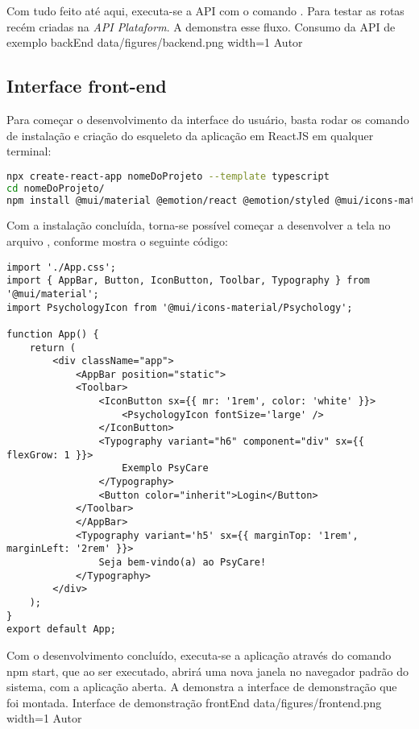 Com tudo feito até aqui, executa-se a API com o comando . Para testar as rotas recém criadas na \textit{API Plataform}. A  demonstra esse fluxo.
\image
    {Consumo da API de exemplo}
    {backEnd}
    {data/figures/backend.png}
    {width=1\textwidth}
    {Autor}

\subsection{Interface front-end}
\label{sec:frontEnd}
Para começar o desenvolvimento da interface do usuário, basta rodar os comando de instalação e criação do esqueleto da aplicação em ReactJS em qualquer terminal:
\begin{lstlisting}[language=bash]
npx create-react-app nomeDoProjeto --template typescript
cd nomeDoProjeto/
npm install @mui/material @emotion/react @emotion/styled @mui/icons-material    
\end{lstlisting}

Com a instalação concluída, torna-se possível começar a desenvolver a tela no arquivo , conforme mostra o seguinte código:
\begin{lstlisting}
import './App.css';
import { AppBar, Button, IconButton, Toolbar, Typography } from '@mui/material';
import PsychologyIcon from '@mui/icons-material/Psychology';

function App() {
    return (
        <div className="app">
            <AppBar position="static">
            <Toolbar>
                <IconButton sx={{ mr: '1rem', color: 'white' }}>
                    <PsychologyIcon fontSize='large' />
                </IconButton>
                <Typography variant="h6" component="div" sx={{ flexGrow: 1 }}>
                    Exemplo PsyCare
                </Typography>
                <Button color="inherit">Login</Button>
            </Toolbar>
            </AppBar>
            <Typography variant='h5' sx={{ marginTop: '1rem', marginLeft: '2rem' }}>
                Seja bem-vindo(a) ao PsyCare!
            </Typography>
        </div>
    );
}
export default App;
\end{lstlisting}

Com o desenvolvimento concluído, executa-se a aplicação através do comando npm start, que ao ser executado, abrirá uma nova janela no navegador padrão do sistema, com a aplicação aberta. A  demonstra a interface de demonstração que foi montada.
\image
    {Interface de demonstração}
    {frontEnd}
    {data/figures/frontend.png}
    {width=1\textwidth}
    {Autor}